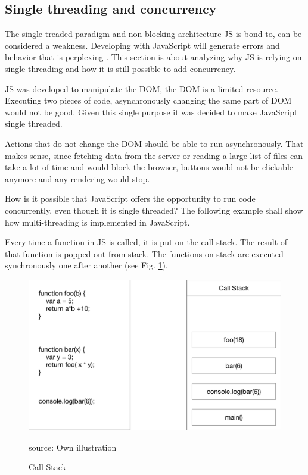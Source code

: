 \subsection{Single threading and concurrency}
The single treaded paradigm and non blocking architecture \gls{JS} is bond to, can be considered a weakness. Developing with JavaScript will generate errors and behavior that is perplexing . This section is about analyzing why \gls{JS} is relying on single threading and how it is still possible to add concurrency. \cite{Steyer2014JavaScript}

\gls{JS} was developed to manipulate the DOM, the DOM is a limited resource. Executing two pieces of code, asynchronously changing the same part of DOM would not be good. Given this single purpose it was decided to make JavaScript single threaded.

Actions that do not change the DOM should be able to run asynchronously. That makes sense, since fetching data from the server or reading a large list of files can take a lot of time and would block the browser, buttons would not be clickable anymore and any rendering would stop. 

How is it possible that JavaScript offers the opportunity to run code concurrently, even though it is single threaded? The following example shall show how multi-threading is implemented in JavaScript.

Every time a function in \gls{JS} is called, it is put on the call stack. The result of that function is popped out from stack. The functions on stack are executed synchronously one after another (see Fig. \ref{fig:CS}).

\begin{figure}[H]
	\centering
	\includegraphics[width=0.8\linewidth]{bilder/grundlagen/CallStack.png}
	\caption{Call Stack} source: Own illustration
	\label{fig:CS}
\end{figure}

